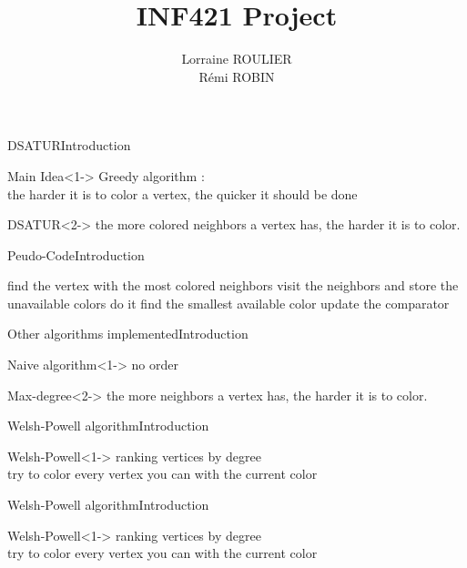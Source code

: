 \documentclass[aspectratio=169]{beamer}
\title[Graph Coloring]{INF421 Project}
\author{Lorraine ROULIER \\ R\'emi ROBIN}
\begin{document}
  \maketitle
 \begin{frame}{DSATUR}{Introduction}
      \begin{block}{Main Idea}<1->
        Greedy algorithm :\\
        the harder it is to color a vertex, the quicker it should be done
      \end{block}

      \begin{block}{DSATUR}<2->
        the more colored neighbors a vertex has, the harder it is to color.
      \end{block}
\end{frame}
 \begin{frame}{Peudo-Code}{Introduction}
 \begin{algorithm}[H]
    \caption{DSATUR}
    \begin{algorithmic}
        \newline
        \State find the vertex with the most colored neighbors 
        \State visit the neighbors and store the unavailable colors
         
   		\State do it
	\Else
   		\State find the smallest available color 
        \EndIf
        \State update the comparator 
        \EndWhile
        \EndProcedure
    \end{algorithmic}
    \label{alg_1}
\end{algorithm}
 \end{frame}
 \begin{frame}{Other algorithms implemented}{Introduction}
      \begin{block}{Naive algorithm}<1->
        no order
      \end{block}
      \begin{block}{Max-degree}<2->
        the more neighbors a vertex has, the harder it is to color.
      \end{block}
\end{frame}
 \begin{frame}{Welsh-Powell algorithm}{Introduction}
      \begin{block}{Welsh-Powell}<1->
        ranking vertices by degree\\
        try to color every vertex you can with the current color
      \end{block}
\end{frame}
 \begin{frame}{Welsh-Powell algorithm}{Introduction}
      \begin{block}{Welsh-Powell}<1->
        ranking vertices by degree\\
        try to color every vertex you can with the current color
      \end{block}
\end{frame}
\end{document}
